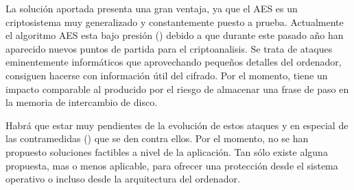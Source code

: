 \documentclass{cedi}%
\theoremstyle{plain}        			%
\theoremstyle{definition}   			%
\theoremstyle{saltolinea}   			%
\begin{document}
La soluci\'on aportada presenta una gran ventaja, ya que el AES es un criptosistema muy generalizado y constantemente puesto a prueba. Actualmente el algoritmo AES esta bajo presi\'on (\cite{OHT05,BERN05}) debido a que durante este pasado a\~no han aparecido nuevos puntos de partida para el criptoanalisis. Se trata de ataques eminentemente inform\'aticos que aprovechando peque\~nos detalles del ordenador, consiguen hacerse con informaci\'on \'util del cifrado. Por el momento, tiene un impacto comparable al producido por el riesgo de almacenar una frase de paso en la memoria de intercambio de disco.

Habr\'a que estar muy pendientes de la evoluci\'on de estos ataques y en especial de las contramedidas (\cite{OST05}) que se den contra ellos. Por el momento, no se han propuesto soluciones factibles a nivel de la aplicaci\'on. Tan s\'olo existe alguna propuesta, mas o menos aplicable, para ofrecer una protecci\'on desde el sistema operativo o incluso desde la arquitectura del ordenador.




%
%
%
\end{document}
